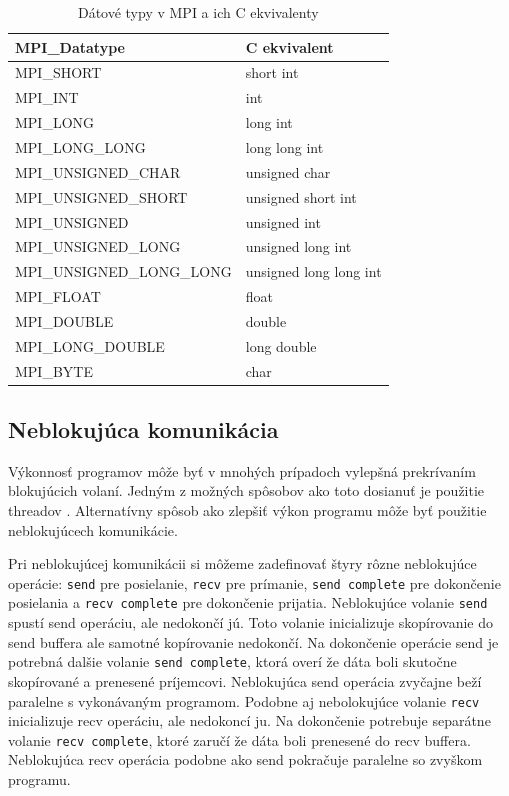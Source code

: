\begin{table}[!h]
\centering
\begin{tabular}{@{}ll@{}}
\toprule
\textbf{MPI\_Datatype}    & \textbf{C ekvivalent}  \\ \midrule
MPI\_SHORT                & short int              \\
MPI\_INT                  & int                    \\
MPI\_LONG                 & long int               \\
MPI\_LONG\_LONG           & long long int          \\
MPI\_UNSIGNED\_CHAR       & unsigned char          \\
MPI\_UNSIGNED\_SHORT      & unsigned short int     \\
MPI\_UNSIGNED             & unsigned int           \\
MPI\_UNSIGNED\_LONG       & unsigned long int      \\
MPI\_UNSIGNED\_LONG\_LONG & unsigned long long int \\
MPI\_FLOAT                & float                  \\
MPI\_DOUBLE               & double                 \\
MPI\_LONG\_DOUBLE         & long double            \\
MPI\_BYTE                 & char                   \\ \bottomrule
\end{tabular}
\caption{Dátové typy v MPI a ich C ekvivalenty}
\label{tab:mpi-datatypes}
\end{table}

\subsection{Neblokujúca komunikácia}
Výkonnosť programov môže byť v mnohých prípadoch vylepšná prekrívaním blokujúcich volaní.
Jedným z možných spôsobov ako toto dosianuť je použitie threadov \cite{mpi3-1}.
Alternatívny spôsob ako zlepšiť výkon programu môže byť použitie neblokujúcech komunikácie.

Pri neblokujúcej komunikácii si môžeme zadefinovať štyry rôzne neblokujúce operácie: \texttt{send} pre posielanie,
\texttt{recv} pre prímanie, \texttt{send complete} pre dokončenie posielania a \texttt{recv complete} pre dokončenie prijatia.
Neblokujúce volanie \texttt{send} spustí send operáciu, ale nedokončí jú.
Toto volanie inicializuje skopírovanie do send buffera ale samotné kopírovanie nedokončí.
Na dokončenie operácie send je potrebná dalšie volanie \texttt{send complete},
ktorá overí že dáta boli skutočne skopírované a prenesené príjemcovi.
Neblokujúca send operácia zvyčajne beží paralelne s vykonávaným programom.
Podobne aj nebolokujúce volanie \texttt{recv} inicializuje recv operáciu, ale nedokoncí ju. Na dokončenie potrebuje separátne volanie \texttt{recv complete},
ktoré zaručí že dáta boli prenesené do recv buffera. Neblokujúca recv operácia podobne ako send pokračuje paralelne so zvyškom programu.

